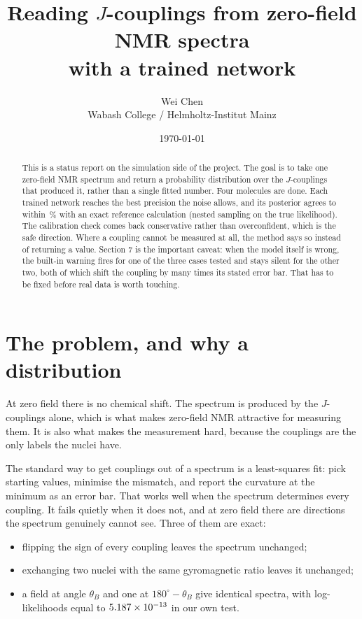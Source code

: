 \documentclass[11pt,a4paper]{article}
\title{\vspace{-1.5cm}Reading $J$-couplings from zero-field NMR spectra\\
       with a trained network}
\author{Wei Chen \\ \small Wabash College / Helmholtz-Institut Mainz}
\date{\today}
\begin{document}
\maketitle

\begin{abstract}
\noindent
This is a status report on the simulation side of the project. The goal is to
take one zero-field NMR spectrum and return a probability distribution over the
$J$-couplings that produced it, rather than a single fitted number. Four
molecules are done. Each trained network reaches the best precision the noise
allows, and its posterior agrees to within \zVsNestedRelDifferencePct\,\% with
an exact reference calculation (nested sampling on the true likelihood). The
calibration check comes back conservative rather than overconfident, which is
the safe direction. Where a coupling cannot
be measured at all, the method says so instead of returning a value. Section 7
is the important caveat: when the model itself is wrong, the built-in warning
fires for one of the three cases tested and stays silent for the other two,
both of which shift the coupling by many times its stated error bar. That has
to be fixed before real data is worth touching.
\end{abstract}

\section{The problem, and why a distribution}

At zero field there is no chemical shift. The spectrum is produced by the
$J$-couplings alone, which is what makes zero-field NMR attractive for
measuring them. It is also what makes the measurement hard, because the
couplings are the only labels the nuclei have.

The standard way to get couplings out of a spectrum is a least-squares fit: pick
starting values, minimise the mismatch, and report the curvature at the minimum
as an error bar. That works well when the spectrum determines every coupling.
It fails quietly when it does not, and at zero field there are directions the
spectrum genuinely cannot see. Three of them are exact:

\begin{itemize}
\item flipping the sign of every coupling leaves the spectrum unchanged;
\item exchanging two nuclei with the same gyromagnetic ratio leaves it
      unchanged;
\item a field at angle $\theta_B$ and one at $180^\circ-\theta_B$ give
      identical spectra, with log-likelihoods equal to
      $5.187\times10^{-13}$ in our own test.
\end{itemize}
\end{document}
